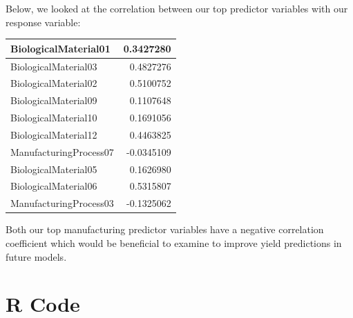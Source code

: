 \documentclass[]{report}
\begin{document}
Below, we looked at the correlation between our top predictor variables
with our response variable:

\begin{table}[H]
\centering
\begin{tabular}{l|r}
\hline
BiologicalMaterial01 & 0.3427280\\
\hline
\rowcolor{gray!6}  BiologicalMaterial03 & 0.4827276\\
\hline
BiologicalMaterial02 & 0.5100752\\
\hline
\rowcolor{gray!6}  BiologicalMaterial09 & 0.1107648\\
\hline
BiologicalMaterial10 & 0.1691056\\
\hline
\rowcolor{gray!6}  BiologicalMaterial12 & 0.4463825\\
\hline
ManufacturingProcess07 & -0.0345109\\
\hline
\rowcolor{gray!6}  BiologicalMaterial05 & 0.1626980\\
\hline
BiologicalMaterial06 & 0.5315807\\
\hline
\rowcolor{gray!6}  ManufacturingProcess03 & -0.1325062\\
\hline
\end{tabular}
\end{table}

Both our top manufacturing predictor variables have a negative
correlation coefficient which would be beneficial to examine to improve
yield predictions in future models.

\hypertarget{r-code}{%
\section{R Code}\label{r-code}}
\end{document}
